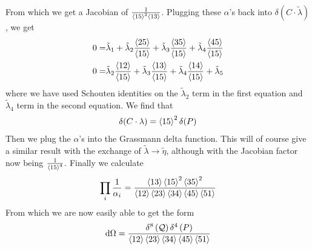 \documentclass[letter,11pt]{article}
\begin{document}
From which we get a Jacobian of $\frac{1}{\expval{15}^2\expval{13}}$. Plugging these $\alpha$'s back into $\delta (C\cdot\tilde \lambda)$, we get
\begin{equation}
	\begin{aligned}
0=&\tilde\lambda_1
+
\tilde\lambda_2 \frac{\expval{25}}{\expval{15}}
+
\tilde\lambda_3
\frac{\expval{35}}{\expval{15}}
+
\tilde\lambda_4
\frac{\expval{45}}{\expval{15}}\\
0=&\tilde\lambda_2 \frac{\expval{12}}{\expval{15}}
+
\tilde\lambda_3
\frac{\expval{13}}{\expval{15}}
+
\tilde\lambda_4 \frac{\expval{14}}{\expval{15}}
+
\tilde\lambda_5
\end{aligned}
\end{equation}
where we have used Schouten identities on the $\tilde\lambda_2$ term in the first equation and $\tilde \lambda_4$ term in the second equation. We find that
\begin{equation}
	\begin{aligned}
		\delta(C\cdot\lambda)=\expval{15}^2\delta (P)
	\end{aligned}
\end{equation}
Then we plug the $\alpha$'s into the Grassmann delta function. This will of course give a similar result with the exchange of $\tilde\lambda\to \tilde\eta$, although with the Jacobian factor now being $\frac{1}{\expval{15}^4}$. Finally we calculate
\begin{equation}
	\begin{aligned}
		\prod_i\frac{1}{\alpha_i}=\frac{\expval{13} \expval{15}^2 \expval{35}^2}{\expval{12}\expval{23}\expval{34}\expval{45}\expval{51}}
	\end{aligned}
\end{equation}
From which we are now easily able to get the form
\begin{equation}
	\begin{aligned}
		\dd \Omega =
		\frac{\delta^{8}\left(\mathcal{Q}\right)\delta^{4}\left(P\right)}{\expval{12}\expval{23}\expval{34}\expval{45}\expval{51}}
	\end{aligned}
\end{equation}
\end{document}
